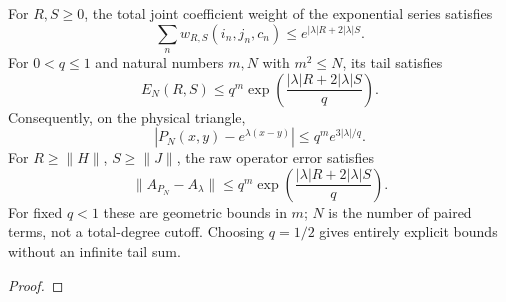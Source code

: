 
\begin{theorem}
\label{thm:volterra-exponential-tail}
\leanok
For $R,S\ge0$, the total joint coefficient weight of the exponential series satisfies
\[
 \sum_n w_{R,S}(i_n,j_n,c_n)\le e^{|\lambda|R+2|\lambda|S}.
\]
For $0<q\le1$ and natural numbers $m,N$ with $m^2\le N$, its tail satisfies
\[
 E_N(R,S)\le q^m\exp\!\left(\frac{|\lambda|R+2|\lambda|S}{q}\right).
\]
Consequently, on the physical triangle,
\[
 |P_N(x,y)-e^{\lambda(x-y)}|\le q^m e^{3|\lambda|/q}.
\]
For $R\ge\|H\|$, $S\ge\|J\|$, the raw operator error satisfies
\[
 \|A_{P_N}-A_\lambda\|\le
 q^m\exp\!\left(\frac{|\lambda|R+2|\lambda|S}{q}\right).
\]
For fixed $q<1$ these are geometric bounds in $m$; $N$ is the number of
paired terms, not a total-degree cutoff. Choosing $q=1/2$ gives entirely
explicit bounds without an infinite tail sum.
\end{theorem}
\begin{proof}
\leanok
\end{proof}


